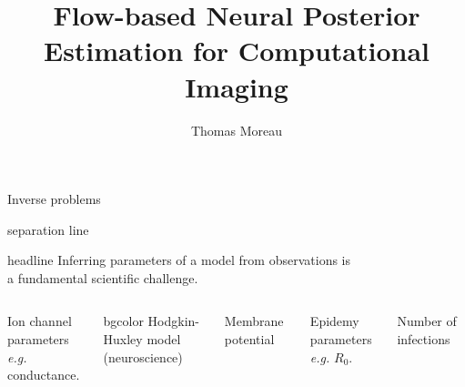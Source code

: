 \documentclass{beamer}
\institute{INRIA Saclay}
\author{Thomas Moreau}
\title{
    Flow-based Neural Posterior Estimation for Computational Imaging
}
\def\biblio{
    \nobibliography{../../library}
    \def\biblio{}
}
\begin{document}
    \begin{frame}
        \titlepage
    \end{frame}

    \begin{frame}{Inverse problems}
        \begin{beamercolorbox}[wd=\textwidth, center, sep=.3ex]{separation line}
        \begin{beamercolorbox}[wd=.99\textwidth, center, sep=1ex]{headline}
            Inferring parameters of a model from observations is\\
            a fundamental scientific challenge.
        \end{beamercolorbox}
        \end{beamercolorbox}

        \begin{columns}[T]
            Ion channel parameters\\
            \emph{e.g.} conductance.\\[.3em]
            \begin{beamercolorbox}[wd=\textwidth, center, sep=1ex]{bgcolor}
                Hodgkin-Huxley model\\
                (neuroscience)
            \end{beamercolorbox}
            Membrane potential

            Epidemy parameters\\
            \emph{e.g.} $R_0$.\\[.3em]
            Number of infections


\end{columns}
\end{frame}
\end{document}

